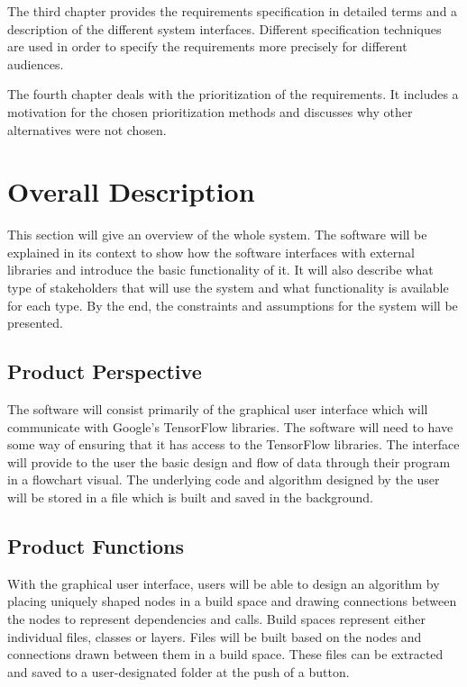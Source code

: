 \documentclass[journal,10pt,onecolumn,compsoc]{IEEEtran} \usepackage[margin=1.0in]{geometry} \usepackage{pdfpages} \usepackage{graphicx}
\begin{document}
The third chapter provides the requirements specification in detailed terms and a description of the different system interfaces. 
Different specification techniques are used in order to specify the requirements more precisely for different audiences.

The fourth chapter deals with the prioritization of the requirements. 
It includes a motivation for the chosen prioritization methods and discusses why other alternatives were not chosen.

\newpage

\section{Overall Description}

This section will give an overview of the whole system. 
The software will be explained in its context to show how the software interfaces with external libraries and introduce the basic functionality of it. 
It will also describe what type of stakeholders that will use the system and what functionality is available for each type. 
By the end, the constraints and assumptions for the system will be presented.

\subsection{Product Perspective}

The software will consist primarily of the graphical user interface which will communicate with Google's TensorFlow libraries. 
The software will need to have some way of ensuring that it has access to the TensorFlow libraries. 
The interface will provide to the user the basic design and flow of data through their program in a flowchart visual.
The underlying code and algorithm designed by the user will be stored in a file which is built and saved in the background. 

\subsection{Product Functions}

With the graphical user interface, users will be able to design an algorithm by placing uniquely shaped nodes in a build space and drawing connections between the nodes to represent dependencies and calls.
Build spaces represent either individual files, classes or layers. 
Files will be built based on the nodes and connections drawn between them in a build space.
These files can be extracted and saved to a user-designated folder at the push of a button.
\end{document}
